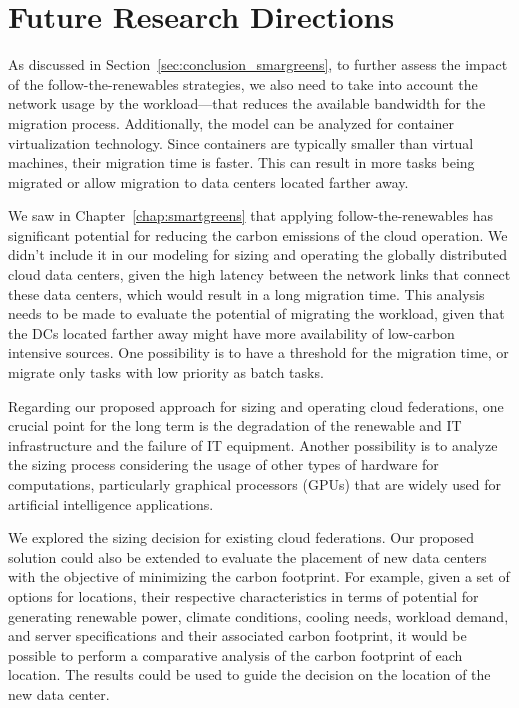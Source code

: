 \section{Future Research Directions}

\label{sec:conclusion_future_research}


As discussed in Section~\ref{sec:conclusion_smargreens}, to further assess the impact of the follow-the-renewables strategies, we also need to take into account the network usage by the workload---that reduces the available bandwidth for the migration process. Additionally, the model can be analyzed for container virtualization technology. Since containers are typically smaller than virtual machines, their migration time is faster. This can result in more tasks being migrated or allow migration to data centers located farther away.


We saw in Chapter~\ref{chap:smartgreens} that applying follow-the-renewables has significant potential for reducing the carbon emissions of the cloud operation. We didn't include it in our modeling for sizing and operating the globally distributed cloud data centers, given the high latency between the network links that connect these data centers, which would result in a long migration time. This analysis needs to be made to evaluate the potential of migrating the workload, given that the DCs located farther away might have more availability of low-carbon intensive sources. One possibility is to have a threshold for the migration time, or migrate only tasks with low priority as batch tasks.

Regarding our proposed approach for sizing and operating cloud federations, one crucial point for the long term is the degradation of the renewable and IT infrastructure and the failure of IT equipment. Another possibility is to analyze the sizing process considering the usage of other types of hardware for computations, particularly graphical processors (GPUs) that are widely used for artificial intelligence applications.

We explored the sizing decision for existing cloud federations. Our proposed solution could also be extended to evaluate the placement of new data centers with the objective of minimizing the carbon footprint. For example, given a set of options for locations, their respective characteristics in terms of potential for generating renewable power, climate conditions, cooling needs, workload demand, and server specifications and their associated carbon footprint, it would be possible to perform a comparative analysis of the carbon footprint of each location. The results could be used to guide the decision on the location of the new data center.

